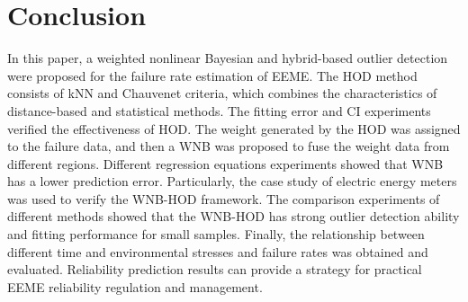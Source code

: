 \documentclass[journal,twoside,web]{ieeecolor}
\begin{document}
\section{Conclusion}
\label{Section5}
In this paper, a weighted nonlinear Bayesian and hybrid-based outlier detection were proposed for the failure rate estimation of EEME. The HOD method consists of kNN and Chauvenet criteria, which combines the characteristics of distance-based and statistical methods. The fitting error and CI experiments verified the effectiveness of HOD. The weight generated by the HOD was assigned to the failure data, and then a WNB was proposed to fuse the weight data from different regions. Different regression equations experiments showed that WNB has a lower prediction error. Particularly, the case study of electric energy meters was used to verify the WNB-HOD framework. The comparison experiments of different methods showed that the WNB-HOD has strong outlier detection ability and fitting performance for small samples. Finally, the relationship between different time and environmental stresses and failure rates was obtained and evaluated. Reliability prediction results can provide a strategy for practical EEME reliability regulation and management. 





\end{document}
